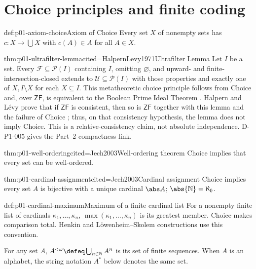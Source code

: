 \section{Choice principles and finite coding}
\label{sec:p01-choice-coding}
\begin{hbdefinition}{def:p01-axiom-choice}{Axiom of Choice}
Every set \(X\) of nonempty sets has \(c:X\to\bigcup X\) with
\(c(A)\in A\) for all \(A\in X\).
\end{hbdefinition}
\begin{hbtheorem}{thm:p01-ultrafilter-lemma}{cited=HalpernLevy1971}{Ultrafilter Lemma}
Let \(I\) be a set.  Every \(\mathcal F\subseteq\mathcal P(I)\) containing
\(I\), omitting \(\varnothing\), and upward- and finite-intersection-closed
extends to \(\mathcal U\subseteq\mathcal P(I)\) with those properties and
exactly one of \(X,I\setminus X\) for each \(X\subseteq I\).
This metatheoretic choice principle follows from Choice and, over
\(\mathsf{ZF}\), is equivalent to the Boolean Prime Ideal Theorem
\cite{Jech2003}.  Halpern and L\'evy prove that if \(\mathsf{ZF}\) is
consistent, then so is \(\mathsf{ZF}\) together with this lemma and the
failure of Choice \cite{HalpernLevy1971}; thus, on that consistency
hypothesis, the lemma does not imply Choice.  This is a relative-consistency
claim, not absolute independence.  D-P1-005 gives the Part~2 compactness link.
\end{hbtheorem}
\begin{hbtheorem}{thm:p01-well-ordering}{cited=Jech2003}{Well-ordering theorem}
Choice implies that every set can be well-ordered.
\end{hbtheorem}
\begin{hbcorollary}{thm:p01-cardinal-assignment}{cited=Jech2003}{Cardinal assignment}
Choice implies every set \(A\) is bijective with a unique cardinal
\(\abs A\); \(\abs{\mathbb N}=\aleph_0\).
\end{hbcorollary}
\begin{hbconvention}{def:p01-cardinal-maximum}{Maximum of a finite cardinal list}
For a nonempty finite list of cardinals \(\kappa_1,\ldots,\kappa_n\),
\(\max(\kappa_1,\ldots,\kappa_n)\) is its greatest member.  Choice makes
comparison total.  Henkin and
L\"owenheim--Skolem constructions use this convention.
\end{hbconvention}
For any set \(A\),
\(A^{<\omega}\defeq\bigcup_{n\in\mathbb N}A^n\) is its set of finite
sequences.  When \(A\) is an alphabet, the string notation \(A^*\) below
denotes the same set.
